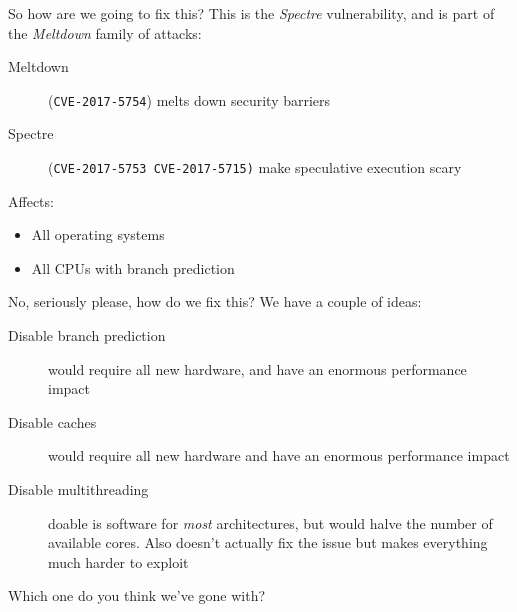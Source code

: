\documentclass[9pt,aspectratio=169]{beamer}
\begin{document}
\begin{frame}[label={sec:orgc495676},fragile]{So how are we going to fix this?}
 This is the \emph{Spectre} vulnerability, and is part of the \emph{Meltdown} family of attacks:
\begin{description}
\item[{Meltdown}] (\texttt{CVE-2017-5754}) melts down security barriers
\item[{Spectre}] (\texttt{CVE-2017-5753 CVE-2017-5715)} make speculative execution scary
\end{description}

Affects:
\begin{itemize}
\item All operating systems
\item All CPUs with branch prediction
\end{itemize}
\end{frame}

\begin{frame}[label={sec:orgc9b8378}]{No, seriously please, how do we fix this?}
We have a couple of ideas:

\begin{description}
\item[{Disable branch prediction}] would require all new hardware, and have an enormous performance impact
\item[{Disable caches}] would require all new hardware and have an enormous performance impact
\item[{Disable multithreading}] doable is software for \emph{most} architectures, but would halve the number of available cores.  Also doesn't actually fix the issue but makes everything much harder to exploit
\end{description}

Which one do you think we've gone with?
\end{frame}
\end{document}
